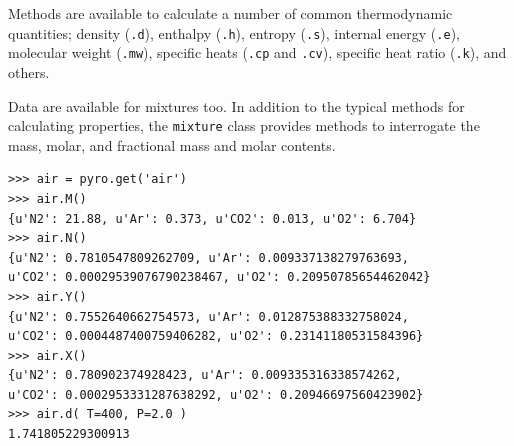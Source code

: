 Methods are available to calculate a number of common thermodynamic quantities; density (\verb|.d|), enthalpy (\verb|.h|), entropy (\verb|.s|), internal energy (\verb|.e|), molecular weight (\verb|.mw|), specific heats (\verb|.cp| and \verb|.cv|), specific heat ratio (\verb|.k|), and others.

Data are available for mixtures too.  In addition to the typical methods for calculating properties, the \verb|mixture| class provides methods to interrogate the mass, molar, and fractional mass and molar contents.
\begin{verbatim}
>>> air = pyro.get('air')
>>> air.M()
{u'N2': 21.88, u'Ar': 0.373, u'CO2': 0.013, u'O2': 6.704}
>>> air.N()
{u'N2': 0.7810547809262709, u'Ar': 0.009337138279763693, 
u'CO2': 0.00029539076790238467, u'O2': 0.20950785654462042}
>>> air.Y()
{u'N2': 0.7552640662754573, u'Ar': 0.012875388332758024, 
u'CO2': 0.0004487400759406282, u'O2': 0.23141180531584396}
>>> air.X()
{u'N2': 0.780902374928423, u'Ar': 0.009335316338574262, 
u'CO2': 0.0002953331287638292, u'O2': 0.20946697560423902}
>>> air.d( T=400, P=2.0 )
1.741805229300913
\end{verbatim}


